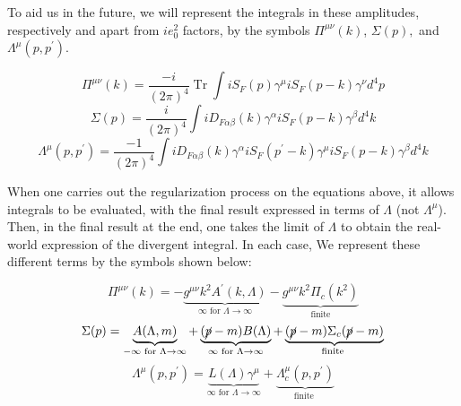 To aid us in the future, we will represent the integrals in these amplitudes, respectively and apart from $ie_0^2$ factors, by the symbols $\Pi^{\mu\nu}(k)$, $\Sigma(p),$ and $\Lambda^{\mu}\left(p, p^{\prime}\right)$.
\begin{qt}
    \begin{equation}\Pi^{\mu \nu}(k)=\frac{-i}{(2 \pi)^{4}} \operatorname{Tr} \int i S_{F}(p) \gamma^{\mu} i S_{F}(p-k) \gamma^{\nu} d^{4} p
    \label{pi-integral}
    \end{equation}
    \begin{equation}\Sigma(p)=\frac{i}{(2 \pi)^{4}} \int i D_{F \alpha \beta}(k) \gamma^{\alpha} i S_{F}(p-k) \gamma^{\beta} d^{4} k
    \label{sigma-integral}
    \end{equation}
    \begin{equation}\Lambda^{\mu}\left(p, p^{\prime}\right)=\frac{-1}{(2 \pi)^{4}} \int i D_{F \alpha \beta}(k) \gamma^{\alpha} i S_{F}\left(p^{\prime}-k\right) \gamma^{\mu} i S_{F}(p-k) \gamma^{\beta} d^{4} k
    \label{lambda-integral}
    \end{equation}
\end{qt}
When one carries out the regularization process on the equations above, it allows integrals to be evaluated, with the final result expressed in terms of $\Lambda$ (not $\Lambda^{\mu}$). Then, in the final result at the end, one takes the limit of $\Lambda$ to obtain the real-world expression of the divergent integral. In each case, \textbf{} We represent these different terms by the symbols shown below:
\begin{qt}
    \begin{equation}\Pi^{\mu \nu}(k)=-\underbrace{g^{\mu \nu} k^{2} A^{\prime}(k, \Lambda)}_{\infty \text { for } \Lambda \to \infty}-\underbrace{g^{\mu \nu} k^{2} \Pi_{c}\left(k^{2}\right)}_{\text { finite }}\end{equation}
    \begin{equation}\Sigma(p)=\underbrace{A(\Lambda, m)}_{-\infty \text { for } \Lambda \rightarrow \infty}+\underbrace{(\cancel{p}-m) B(\Lambda)}_{\infty \text { for } \Lambda \rightarrow \infty}+\underbrace{(\cancel{p}-m) \Sigma_{c}(\cancel{p}-m)}_{\text {finite }}\end{equation}
    \begin{equation}\Lambda^{\mu}\left(p, p^{\prime}\right)=\underbrace{L(\Lambda) \gamma^{\mu}}_{\infty \text { for } \Lambda \rightarrow \infty}+\underbrace{\Lambda_{c}^{\mu}\left(p, p^{\prime}\right)}_{\text {finite }}\end{equation}
\end{qt}
